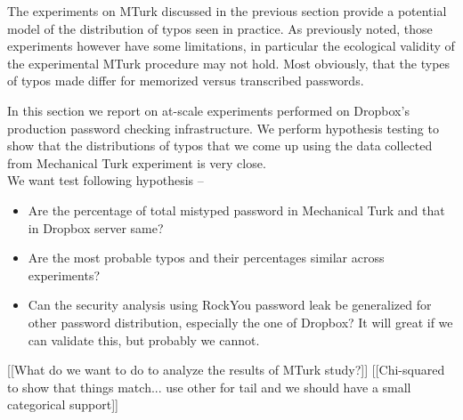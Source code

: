 The experiments on MTurk discussed in the previous section provide a potential
model of the distribution of typos seen in practice. As previously noted, those
experiments however have some limitations, in particular the ecological validity
of the experimental MTurk procedure may not hold. Most obviously, that the types
of typos made differ for memorized versus transcribed passwords. 

In this section we report on at-scale experiments performed on Dropbox's
production password checking infrastructure. We perform hypothesis testing to
show that the distributions of typos that we come up using the data collected
from Mechanical Turk experiment is very close. \\

We want test following hypothesis -- 
\begin{itemize}
\item Are the percentage of total mistyped password in Mechanical Turk and that in
  Dropbox server same?
\item Are the most probable typos and their percentages similar across experiments?
\item Can the security analysis using RockYou password leak be generalized for
  other password distribution, especially the one of Dropbox? It will great if
  we can validate this, but probably we cannot.
\end{itemize}


[[What do we want to do to analyze the results of MTurk study?]]
[[Chi-squared to show that things match... use other for tail and we should have
a small categorical support]]
\fi


